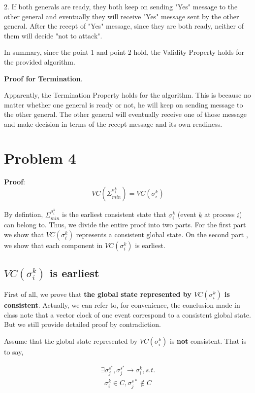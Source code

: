 \documentclass[11pt,a4paper]{article}
\begin{document}
2. If both generals are ready, they both keep on sending "Yes" message to the
other general and eventually they will receive "Yes" message sent by the other
general. After the recept of "Yes" message, since they are both ready, neither
of them will decide "not to attack".

In summary, since the point 1 and point 2 hold, the Validity Property
holds for the provided algorithm.

\textbf{Proof for Termination}. 

Apparently, the Termination Property holds for the algorithm. This is because
no matter whether one general is ready or not, he will keep on sending message
to the other general. The other general will eventually receive one of those
message and make decision in terms of the recept message and its own readiness.

\newpage%

\section{Problem 4}
\textbf{Proof}:
$$ VC (\Sigma_{min}^{\sigma_i^k}) = VC (\sigma_i^k)$$

By defintion, 
$ \Sigma_{min}^{\sigma_{i}^{k}}$ is the earliest consistent state that  $
\sigma_i^k$ (event $k$ at process $i$) can belong to. Thus, we divide the
entire proof into two parts. For the first part we show that
$VC(\sigma_{i}^{k})$ represents a consistent global state. On the second part , we 
show that each component in $VC(\sigma_{i}^{k})$ is earliest.

\subsection{$VC(\sigma_i^k)$ is earliest}
First of all, we prove that 
    \textbf{the global state represented by $VC(\sigma_i^k)$ is consistent}.
    Actually, we can refer to, for convenience, the conclusion made in class
    note that a vector clock of one event correspond to a consistent global
    state. But we still provide detailed proof by contradiction.

    Assume that the global state represented by $VC(\sigma_i^k)$ is
    \textbf{not} consistent. That is to say,

    \begin{align}
     \exists \sigma_j^{s^*}, \sigma_j^{s^*} \rightarrow \sigma_i^k, s.t. 
    \end{align}
    \begin{align}
     \sigma_i^k \in C, \sigma_j^{s*} \notin C 
    \end{align}
\end{document}
